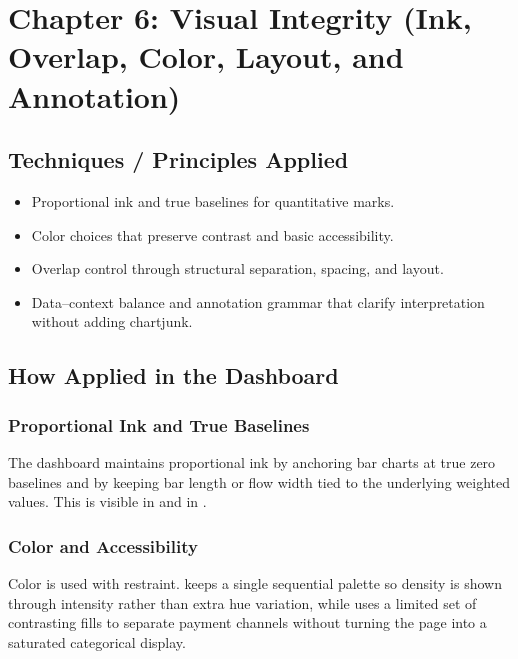 \documentclass[../main.tex]{subfiles}
\begin{document}
\section{Chapter 6: Visual Integrity (Ink, Overlap, Color, Layout, and Annotation)}
\label{sec:chapter6-visual-integrity}

\subsection{Techniques / Principles Applied}

\begin{itemize}[leftmargin=*]
\item Proportional ink and true baselines for quantitative marks.
\item Color choices that preserve contrast and basic accessibility.
\item Overlap control through structural separation, spacing, and layout.
\item Data--context balance and annotation grammar that clarify interpretation
without adding chartjunk.
\end{itemize}

\subsection{How Applied in the Dashboard}

\subsubsection{Proportional Ink and True Baselines}

The dashboard maintains proportional ink by anchoring bar charts at true zero
baselines and by keeping bar length or flow width tied to the underlying
weighted values. This is visible in
 and in
.

\subsubsection{Color and Accessibility}

Color is used with restraint.
 keeps a single
sequential palette so density is shown through intensity rather than extra hue
variation, while 
uses a limited set of contrasting fills to separate payment channels without
turning the page into a saturated categorical display.
\end{document}
